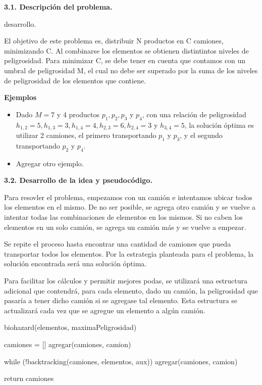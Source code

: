 \noindent
\textbf{3.1. Descripción del problema.}

\vspace*{0.3cm}

desarrollo.

\vspace*{0.75cm} \noindent

El objetivo de este problema es, distribuir N productos en C camiones, minimizando
C. Al combinarse los elementos se obtienen distintintos niveles de peligrosidad.
Para minimizar C, se debe tener en cuenta que contamos con un umbral de peligrosidad
M, el cual no debe ser superado por la suma de los niveles de peligrosidad de los
elementos que contiene.

\textbf{Ejemplos}
\begin{itemize}
  \item Dado $M = 7$ y 4 productos $p_1, p_2, p_3$ y $p_4$, con una relación
  de peligrosidad $h_{1,2} = 5, h_{1,3} = 3, h_{1,4} = 4, h_{2,3} = 6, h_{2,4} =
  3$ y $h_{3,4} = 5$, la solución óptima es utilizar 2 camiones, el primero
  transportando $p_1$ y $p_3$, y el segundo transportando $p_2$ y $p_4$.
  \item Agregar otro ejemplo.
\end{itemize}

\noindent
\textbf{3.2. Desarrollo de la idea y pseudocódigo.}

Para resovler el problema, empezamos con un camión e intentamos ubicar todos los
elementos en el mismo. De no ser posible, se agrega otro camión y se vuelve a
intentar todas las combinaciones de elementos en los mismos. Si no caben los
elementos en un solo camión, se agrega un camión más y se vuelve a empezar.

Se repite el proceso hasta encontrar una cantidad de camiones que pueda transportar
todos los elementos. Por la estrategia planteada para el problema, la solución
encontrada será una solución óptima.

Para facilitar los cálculos y permitir mejores podas, se utilizará una estructura
adicional que contendrá, para cada elemento, dado un camión, la peligrosidad que
pasaría a tener dicho camión si se agregase tal elemento. Esta estructura se
actualizará cada vez que se agregue un elemento a algún camión. 

biohazard(elementos, maximaPeligrosidad) {
  camiones = []
  agregar(camiones, camion)
  
  while (!backtracking(camiones, elementos, aux)) {
    agregar(camiones, camion)
  }
  
  return camiones
}



